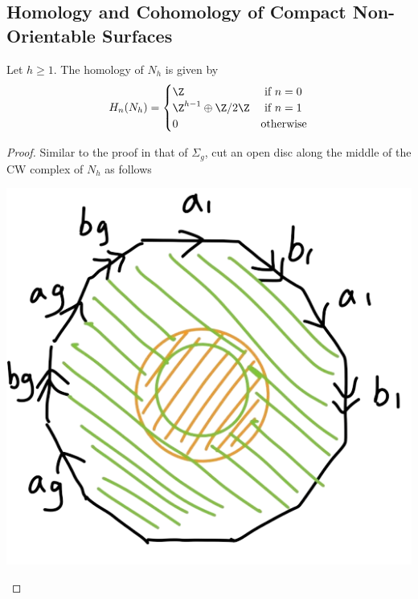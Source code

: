 \documentclass[a4paper]{article}
\begin{document}
\subsection{Homology and Cohomology of Compact Non-Orientable Surfaces}
\begin{prp}{}{} Let $h\geq 1$. The homology of $N_h$ is given by $$H_n(N_h)=\begin{cases}
\Z & \text{ if } n=0\\
\Z^{h-1}\oplus\Z/2\Z & \text{ if } n=1\\
0 & \text{otherwise}
\end{cases}$$ \tcbline
\begin{proof}
Similar to the proof in that of $\Sigma_g$, cut an open disc along the middle of the CW complex of $N_h$ as follows 

\begin{center}
\includegraphics[scale = 0.3]{Image 5}
\end{center}


\end{proof}
\end{prp}
\end{document}
